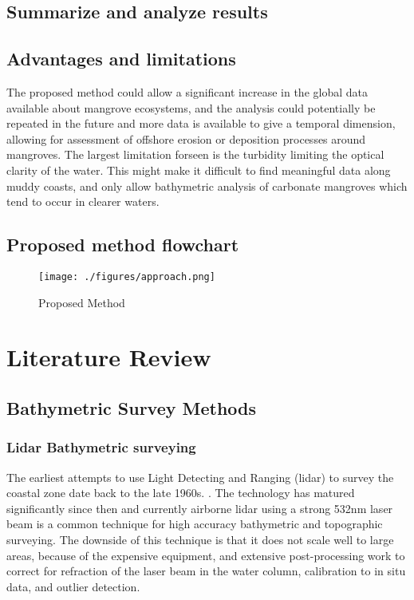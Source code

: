 \section{Summarize and analyze results}


\section{Advantages and limitations}
The proposed method could allow a significant increase in the global data available about mangrove ecosystems, and the analysis could potentially be repeated in the future and more data is available to give a temporal dimension, allowing for assessment of offshore erosion or deposition processes around mangroves. The largest limitation forseen is the turbidity limiting the optical clarity of the water. This might make it difficult to find meaningful data along muddy coasts, and only allow bathymetric analysis of carbonate mangroves which tend to occur in clearer waters.

\section{Proposed method flowchart}
\begin{figure}
      \centering
      \texttt{[image: ./figures/approach.png]}
      \caption{Proposed Method}
      \label{method-flowchart}
\end{figure}

\chapter{Literature Review}


\section{Bathymetric Survey Methods}

\subsection{Lidar Bathymetric surveying}

The earliest attempts to use Light Detecting and Ranging (lidar) to survey the coastal zone date back to the late 1960s. \parencite{Bailly2016}. The technology has matured significantly since then and currently airborne lidar using a strong 532nm laser beam is a common technique for high accuracy bathymetric and topographic surveying. The downside of this technique is that it does not scale well to large areas, because of the expensive equipment, and extensive post-processing work to correct for refraction of the laser beam in the water column, calibration to in situ data, and outlier detection.

